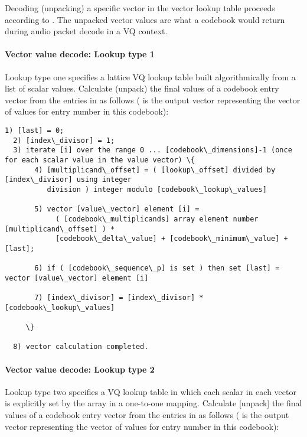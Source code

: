 \bigskip

Decoding (unpacking) a specific vector in the vector lookup table
proceeds according to .  The unpacked
vector values are what a codebook would return during audio packet
decode in a VQ context.

\paragraph{Vector value decode: Lookup type 1}

Lookup type one specifies a lattice VQ lookup table built
algorithmically from a list of scalar values.  Calculate (unpack) the
final values of a codebook entry vector from the entries in
 as follows (
is the output vector representing the vector of values for entry number
 in this codebook):

\begin{Verbatim}[commandchars=\\\{\}]
  1) [last] = 0;
  2) [index\_divisor] = 1;
  3) iterate [i] over the range 0 ... [codebook\_dimensions]-1 (once for each scalar value in the value vector) \{
       4) [multiplicand\_offset] = ( [lookup\_offset] divided by [index\_divisor] using integer
          division ) integer modulo [codebook\_lookup\_values]

       5) vector [value\_vector] element [i] =
            ( [codebook\_multiplicands] array element number [multiplicand\_offset] ) *
            [codebook\_delta\_value] + [codebook\_minimum\_value] + [last];

       6) if ( [codebook\_sequence\_p] is set ) then set [last] = vector [value\_vector] element [i]

       7) [index\_divisor] = [index\_divisor] * [codebook\_lookup\_values]

     \}

  8) vector calculation completed.
\end{Verbatim}



\paragraph{Vector value decode: Lookup type 2}

Lookup type two specifies a VQ lookup table in which each scalar in
each vector is explicitly set by the 
array in a one-to-one mapping.  Calculate [unpack] the
final values of a codebook entry vector from the entries in
 as follows (
is the output vector representing the vector of values for entry number
 in this codebook):

